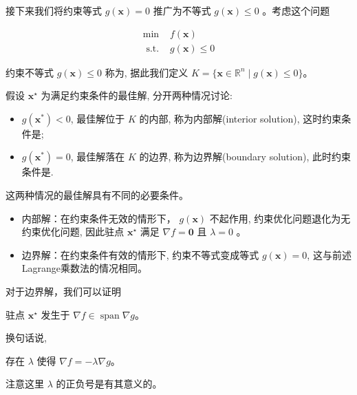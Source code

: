 接下来我们将约束等式 $ g(\mathbf{x})=0 $ 推广为不等式 $ g(\mathbf{x}) \leq 0 $ 。考虑这个问题

\begin{problem}[不等式约束优化问题]

$$
\begin{array}{ll}
\min & f(\mathbf{x}) \\
\text { s.t. } & g(\mathbf{x}) \leq 0
\end{array}
$$

约束不等式 $ g(\mathbf{x}) \leq 0 $ 称为, 据此我们定义 $ K=\{ \mathbf{x} \in \mathbb{R}^{n} \mid g(\mathbf{x}) \leq 0 \}$。
\end{problem}

假设 $ \mathbf{x}^{\star} $ 为满足约束条件的最佳解, 分开两种情况讨论:

\begin{itemize}
    \item $ g\left(\mathbf{x}^{*}\right)<0 $, 最佳解位于 $ K $ 的内部, 称为内部解(interior solution), 这时约束条件是;
    \item $ g\left(\mathbf{x}^{*}\right)=0 $, 最佳解落在 $ K $ 的边界, 称为边界解(boundary solution), 此时约束条件是.
\end{itemize}

这两种情况的最佳解具有不同的必要条件。

\begin{itemize}
    \item 内部解：在约束条件无效的情形下， $ g(\mathbf{x}) $ 不起作用, 约束优化问题退化为无约束优化问题, 因此驻点 $ \mathbf{x}^{\star} $ 满足 $ \nabla f=\mathbf{0} $ 且 $ \lambda=0 $ 。
    \item 边界解：在约束条件有效的情形下, 约束不等式变成等式 $g(\mathbf{x})=0$, 这与前述Lagrange乘数法的情况相同。
\end{itemize}

对于边界解，我们可以证明

\begin{theorem}
    驻点 $\mathbf{x}^{\star}$ 发生于 $\nabla f \in \operatorname{span} \nabla g$。
\end{theorem}
换句话说, 

\begin{corollary}
    存在 $\lambda$ 使得 $\nabla f=-\lambda \nabla g$。

    注意这里 $\lambda$ 的正负号是有其意义的。
\end{corollary}

